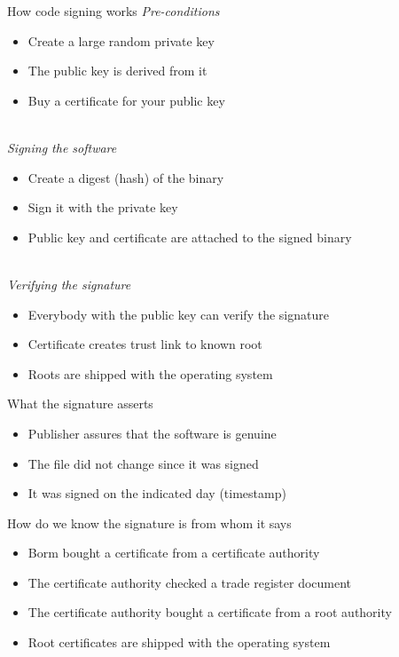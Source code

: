 \documentclass[11pt]{beamer}
\begin{document}
\begin{frame}{How code signing works}
\emph{Pre-conditions}
\begin{itemize}
\item Create a large random private key
\item The public key is derived from it
\item Buy a certificate for your public key
\end{itemize}
\pause
\\[0.2cm]
\emph{Signing the software}
\begin{itemize}
\item Create a digest (hash) of the binary
\item Sign it with the private key
\item Public key and certificate are attached to the signed binary
\end{itemize}
\pause
\\[0.2cm]
\emph{Verifying the signature}
\begin{itemize}
\item Everybody with the public key can verify the signature
\item Certificate creates trust link to known root
\item Roots are shipped with the operating system
\end{itemize}
\end{frame}

\begin{frame}{What the signature asserts}
\begin{itemize}
\item Publisher assures that the software is genuine
\item The file did not change since it was signed
\item It was signed on the indicated day (timestamp)
\end{itemize}
\end{frame}

\begin{frame}{How do we know the signature is from whom it says}
\begin{itemize}
\item Borm bought a certificate from a certificate authority
\item The certificate authority checked a trade register document
\item The certificate authority bought a certificate from a root authority
\item Root certificates are shipped with the operating system
\end{itemize}
\end{frame}
\end{document}
